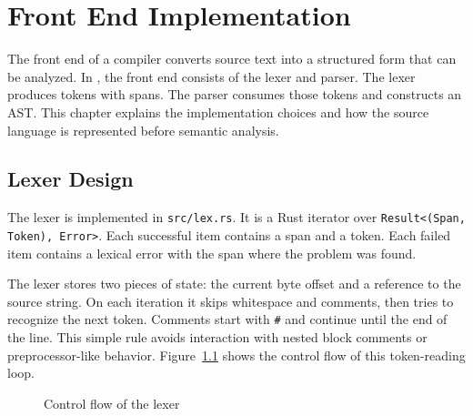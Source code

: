 \chapter{Front End Implementation}
\label{chap:front-end}

The front end of a compiler converts source text into a structured form that can
be analyzed. In \epl{}, the front end consists of the lexer and parser. The
lexer produces tokens with spans. The parser consumes those tokens and constructs
an AST. This chapter explains the implementation choices and how the source
language is represented before semantic analysis.

\section{Lexer Design}

The lexer is implemented in \texttt{src/lex.rs}. It is a Rust iterator over
\texttt{Result<(Span, Token), Error>}. Each successful item contains a span and a
token. Each failed item contains a lexical error with the span where the problem
was found.

The lexer stores two pieces of state: the current byte offset and a reference to
the source string. On each iteration it skips whitespace and comments, then tries
to recognize the next token. Comments start with \texttt{\#} and continue until
the end of the line. This simple rule avoids interaction with nested block
comments or preprocessor-like behavior.
Figure~\ref{fig:lexer-flow} shows the control flow of this token-reading loop.

\begin{figure}[H]
  \centering
  \caption{Control flow of the \epl{} lexer}
  \label{fig:lexer-flow}
\end{figure}

